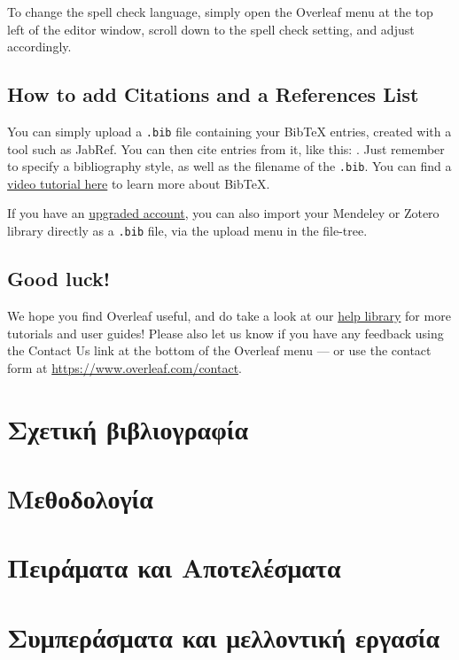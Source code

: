 \documentclass{article}
\begin{document}
To change the spell check language, simply open the Overleaf menu at the top left of the editor window, scroll down to the spell check setting, and adjust accordingly.

\subsection{How to add Citations and a References List}

You can simply upload a \verb|.bib| file containing your BibTeX entries, created with a tool such as JabRef. You can then cite entries from it, like this: \cite{greenwade93}. Just remember to specify a bibliography style, as well as the filename of the \verb|.bib|. You can find a \href{https://www.overleaf.com/help/97-how-to-include-a-bibliography-using-bibtex}{video tutorial here} to learn more about BibTeX.

If you have an \href{https://www.overleaf.com/user/subscription/plans}{upgraded account}, you can also import your Mendeley or Zotero library directly as a \verb|.bib| file, via the upload menu in the file-tree.

\subsection{Good luck!}

We hope you find Overleaf useful, and do take a look at our \href{https://www.overleaf.com/learn}{help library} for more tutorials and user guides! Please also let us know if you have any feedback using the Contact Us link at the bottom of the Overleaf menu --- or use the contact form at \url{https://www.overleaf.com/contact}.

\section{Σχετική βιβλιογραφία}
\section{Μεθοδολογία}
\section{Πειράματα  και Αποτελέσματα}
\section{Συμπεράσματα και μελλοντική εργασία}


\end{document}
